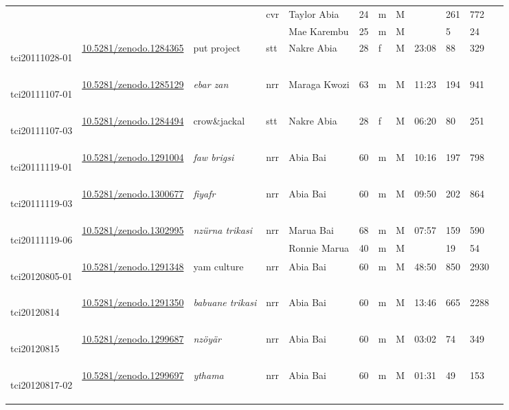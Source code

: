 \begin{landscape}
{\begin{longtable}{p{}lllllllllll}
	&&&\multirow{2}{*}{cvr} & Taylor Abia	& 24 & m & M && 261&772\\
	&&&& Mae Karembu	& 25 & m & M && 5&24\\\hline
	\hypertarget{tci20111028-01}{tci20111028-01} &\href{https://zenodo.org/record/1284365}{10.5281/zenodo.1284365}& put project& stt & Nakre Abia & 28 & f & M & 23:08 & 88&329\\\hline
	\hypertarget{tci20111107-01}{tci20111107-01} &\href{https://zenodo.org/record/1285129}{10.5281/zenodo.1285129}& \emph{ebar zan} & nrr & Maraga Kwozi & 63 & m & M & 11:23 & 194&941\\\hline
	\hypertarget{tci20111107-03}{tci20111107-03} &\href{https://zenodo.org/record/1284494}{10.5281/zenodo.1284494}& crow\&jackal & stt & Nakre Abia & 28 & f & M & 06:20 & 80&251\\\hline
	\hypertarget{tci20111119-01}{tci20111119-01} &\href{https://zenodo.org/record/1291004}{10.5281/zenodo.1291004}& \emph{faw brigsi} & nrr & Abia Bai & 60 & m & M & 10:16 & 197&798\\\hline
	\hypertarget{tci20111119-03}{tci20111119-03} &\href{https://zenodo.org/record/1300677}{10.5281/zenodo.1300677}& \emph{fiyafr} & nrr & Abia Bai & 60 & m & M & 09:50 & 202&864\\\hline
	\multirow{2}{*}{\hypertarget{tci20111119-06}{tci20111119-06}} &\multirow{2}{*}{\href{https://zenodo.org/record/1302995}{10.5281/zenodo.1302995}}& \multirow{2}{*}{\emph{nzürna trikasi}} & \multirow{2}{*}{nrr} & Marua Bai & 68 & m & M & \multirow{2}{*}{07:57} & 159&590\\
	&&&& Ronnie Marua & 40 & m & M & &19&54\\\hline
	\hypertarget{tci20120805-01}{tci20120805-01} &\href{https://zenodo.org/record/1291348}{10.5281/zenodo.1291348}& yam culture & nrr & Abia Bai & 60 & m & M & 48:50 & 850&2930\\\hline
	\hypertarget{tci20120814}{tci20120814} &\href{https://zenodo.org/record/1291350}{10.5281/zenodo.1291350}& \emph{babuane trikasi} & nrr & Abia Bai & 60 & m & M & 13:46 & 665&2288\\\hline
	\hypertarget{tci20120815}{tci20120815} &\href{https://zenodo.org/record/1299687}{10.5281/zenodo.1299687}& \emph{nzöyär} & nrr & Abia Bai & 60 & m & M & 03:02 & 74&349\\\hline
	\hypertarget{tci20120817-02}{tci20120817-02} &\href{https://zenodo.org/record/1299697}{10.5281/zenodo.1299697}& \emph{ythama} & nrr & Abia Bai & 60 & m & M & 01:31 & 49&153\\\hline

\end{longtable}}
\end{landscape}
